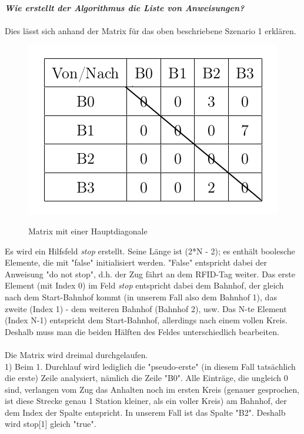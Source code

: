 \\
\textit{\textbf{Wie erstellt der Algorithmus die Liste von Anweisungen?}\\}
\\
Dies lässt sich anhand der Matrix für das oben beschriebene Szenario 1 erklären.\\
\begin{figure}[H]	
\caption{Matrix mit einer Hauptdiagonale}
\center
\includegraphics[width=2\textwidth, width=310pt]{content/images/matrix.png}
\label{pic:Hauptdiagonale}
\end{figure}
\noindent
Es wird ein Hilfsfeld \textit{stop} erstellt. Seine Länge ist (2*N - 2); es enthält boolesche Elemente, die mit "false" initialisiert werden. "False" entspricht dabei der Anweisung "do not stop", d.h. der Zug fährt an dem RFID-Tag weiter. Das erste Element (mit Index 0) im Feld \textit{stop} entspricht dabei dem Bahnhof, der gleich nach dem Start-Bahnhof kommt (in unserem Fall also dem Bahnhof 1), das zweite (Index 1) - dem weiteren Bahnhof (Bahnhof 2), usw. Das N-te Element (Index N-1) entspricht dem Start-Bahnhof, allerdings nach einem vollen Kreis. Deshalb muss man die beiden Hälften des Feldes unterschiedlich bearbeiten.\\
\\
Die Matrix wird dreimal durchgelaufen.\\
1) Beim 1. Durchlauf wird lediglich die "pseudo-erste" (in diesem Fall tatsächlich die erste) Zeile analysiert, nämlich die Zeile "B0". Alle Einträge, die ungleich 0 sind, verlangen vom Zug das Anhalten noch im ersten Kreis (genauer gesprochen, ist diese Strecke genau 1 Station kleiner, als ein voller Kreis) am Bahnhof, der dem Index der Spalte entspricht. In unserem Fall ist das Spalte "B2". Deshalb wird stop[1] gleich "true".\\
\\
